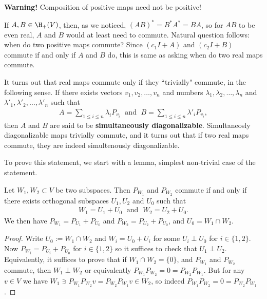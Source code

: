 \textbf{Warning!} Composition of positive maps need not be positive!

If $A, B \in \H_{+}(V)$, then, as we noticed, $(A B)^{*} = B^{*} A^{*} = B A$, so for $A B$ to be even real, $A$ and $B$ would at least need to commute. Natural question follows: when do two positive maps commute? Since $(c_{1} I + A)$ and $(c_{2} I + B)$ commute if and only if $A$ and $B$ do, this is same as asking when do two real maps commute.

It turns out that real maps commute only if they ``trivially" commute, in the following sense. If there exists vectors $v_{1}, v_{2}, \ldots, v_{n}$ and numbers $\lambda_{1}, \lambda_{2}, \ldots, \lambda_{n}$ and $\lambda'_{1}, \lambda'_{2}, \ldots, \lambda'_{n}$ such that
\begin{align*}
	A = \sum_{1 \leq i \leq n} \lambda_{i} P_{v_{i}} \; \text{ and } \; B = \sum_{1 \leq i \leq n} \lambda'_{i} P_{v_{i}},
\end{align*}
then $A$ and $B$ are said to be \textbf{simultaneously diagonalizable}. Simultaneosly diagonalizable maps trivially commute, and it turns out that if two real maps commute, they are indeed simultenously diagonalizable.

To prove this statement, we start with a lemma, simplest non-trivial case of the statement.

\begin{lem}\label{projectionLemma}
	Let $W_{1}, W_{2} \subset V$ be two subspaces. Then $P_{W_{1}}$ and $P_{W_{2}}$ commute if and only if there exists orthogonal subspaces $U_{1}, U_{2}$ and $U_{0}$ such that
	\begin{align*}
		W_{1} = U_{1} + U_{0}  \; \text{ and } \; W_{2} = U_{2} + U_{0}.
	\end{align*}
	We then have $P_{W_{1}} = P_{U_{1}} + P_{U_{0}}$ and $P_{W_{2}} = P_{U_{2}} + P_{U_{0}}$, and $U_{0} = W_{1} \cap W_{2}$.
\end{lem}
\begin{proof}
	Write $U_{0} := W_{1} \cap W_{2}$ and $W_{i} = U_{0} + U_{i}$ for some $U_{i} \perp U_{0}$ for $i \in \{1, 2\}$. Now $P_{W_{i}} = P_{U_{i}} + P_{U_{0}}$ for $i \in \{1, 2\}$ so it suffices to check that $U_{1} \perp U_{2}$. Equivalently, it suffices to prove that if $W_{1} \cap W_{2} = \{0\}$, and $P_{W_{1}}$ and $P_{W_{2}}$ commute, then $W_{1} \perp W_{2}$ or equivalently $P_{W_{1}}P_{W_{2}} = 0 = P_{W_{2}}P_{W_{1}}$. But for any $v \in V$ we have $W_{1} \ni P_{W_{1}}P_{W_{2}}v = P_{W_{2}}P_{W_{1}}v \in W_{2}$, so indeed $P_{W_{1}}P_{W_{2}} = 0 = P_{W_{2}}P_{W_{1}}$.
\end{proof}


